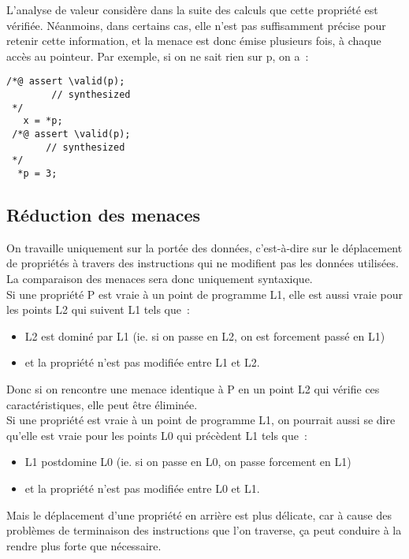 \documentclass[a4paper,twoside]{article}
\begin{document}
L'analyse de valeur considère dans la suite des calculs que cette propriété
est vérifiée. Néanmoins, dans certains cas, elle n'est pas suffisamment précise
pour retenir cette information, et la menace est donc émise plusieurs fois, à
chaque accès au pointeur. Par exemple, si on ne sait rien sur p,
on a~:
\begin{verbatim}
/*@ assert \valid(p);
        // synthesized
 */
   x = *p;
 /*@ assert \valid(p);
       // synthesized
 */
  *p = 3;
\end{verbatim}

\subsection{Réduction des menaces}

On travaille uniquement sur la portée des données,
c'est-à-dire sur le déplacement de propriétés à travers des instructions
qui ne modifient pas les données utilisées.
La comparaison des menaces sera donc uniquement syntaxique.\\

Si une propriété P est vraie à un point de programme L1,
elle est aussi vraie pour les points L2 qui suivent L1 tels que~:
\begin{itemize}
  \item L2 est dominé par L1
(ie. si on passe en L2, on est forcement passé en L1)
\item et la propriété n'est pas modifiée entre L1 et L2.
\end{itemize}
Donc si on rencontre une menace identique à P en un point L2
qui vérifie ces caractéristiques, elle peut être éliminée.\\

Si une propriété est vraie à un point de programme L1,
on pourrait aussi se dire qu'elle est
vraie pour les points L0 qui précèdent L1 tels que~:
\begin{itemize}
  \item L1 postdomine L0
    (ie. si on passe en L0, on passe forcement en L1)
  \item  et la propriété n'est pas modifiée entre L0 et L1.
\end{itemize}
Mais le déplacement d'une propriété en arrière est plus délicate,
car à cause des problèmes de terminaison des instructions que l'on traverse,
ça peut conduire à la rendre plus forte que nécessaire.


\end{document}
